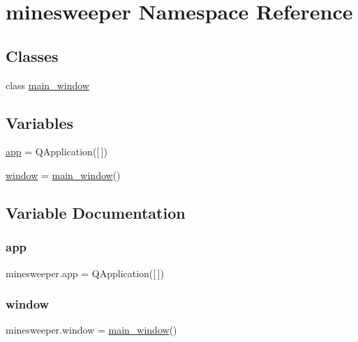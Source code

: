 \hypertarget{namespaceminesweeper}{}\section{minesweeper Namespace Reference}
\label{namespaceminesweeper}
\subsection*{Classes}
\begin{DoxyCompactItemize}
\item 
class \mbox{\hyperlink{classminesweeper_1_1main__window}{main\+\_\+window}}
\end{DoxyCompactItemize}
\subsection*{Variables}
\begin{DoxyCompactItemize}
\item 
\mbox{\hyperlink{namespaceminesweeper_a2211849d28ff8d7bfe0918c610310322}{app}} = Q\+Application(\mbox{[}$\,$\mbox{]})
\item 
\mbox{\hyperlink{namespaceminesweeper_a80cc81c5aa455fb1b4762add4b4d730c}{window}} = \mbox{\hyperlink{classminesweeper_1_1main__window}{main\+\_\+window}}()
\end{DoxyCompactItemize}


\subsection{Variable Documentation}
\mbox{\label{namespaceminesweeper_a2211849d28ff8d7bfe0918c610310322}} 
\subsubsection{\texorpdfstring{app}{app}}
{\footnotesize\ttfamily minesweeper.\+app = Q\+Application(\mbox{[}$\,$\mbox{]})}

\mbox{\label{namespaceminesweeper_a80cc81c5aa455fb1b4762add4b4d730c}} 
\subsubsection{\texorpdfstring{window}{window}}
{\footnotesize\ttfamily minesweeper.\+window = \mbox{\hyperlink{classminesweeper_1_1main__window}{main\+\_\+window}}()}

